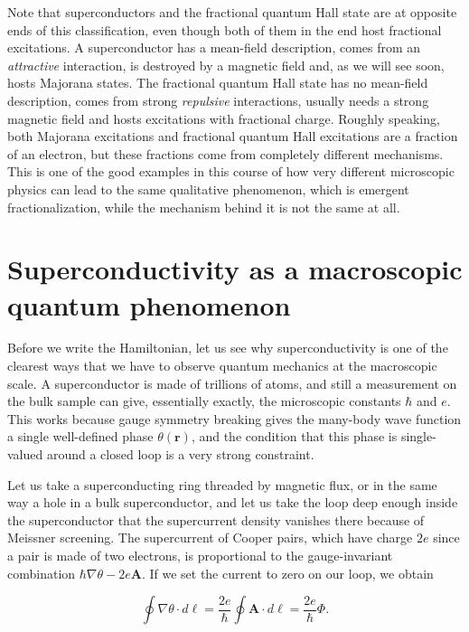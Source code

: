 Note that superconductors and the fractional quantum Hall state are at opposite ends of this
classification, even though both of them in the end host fractional excitations. A superconductor
has a mean-field description, comes from an \emph{attractive} interaction, is destroyed by a
magnetic field and, as we will see soon, hosts Majorana states. The fractional quantum Hall state
has no mean-field description, comes from strong \emph{repulsive} interactions, usually needs a
strong magnetic field and hosts excitations with fractional charge. Roughly speaking, both Majorana
excitations and fractional quantum Hall excitations are a fraction of an electron, but these
fractions come from completely different mechanisms. This is one of the good examples in this course
of how very different microscopic physics can lead to the same qualitative phenomenon, which is
emergent fractionalization, while the mechanism behind it is not the same at all.

\section{Superconductivity as a macroscopic quantum phenomenon}

Before we write the Hamiltonian, let us see why superconductivity is one of the clearest ways that
we have to observe quantum mechanics at the macroscopic scale. A superconductor is made of trillions
of atoms, and still a measurement on the bulk sample can give, essentially exactly, the microscopic
constants $\hbar$ and $e$. This works because gauge symmetry breaking gives the many-body wave
function a single well-defined phase $\theta(\mathbf{r})$, and the condition that this phase is
single-valued around a closed loop is a very strong constraint.

Let us take a superconducting ring threaded by magnetic flux, or in the same way a hole in a bulk
superconductor, and let us take the loop deep enough inside the superconductor that the
supercurrent density vanishes there because of Meissner screening. The supercurrent of Cooper pairs,
which have charge $2e$ since a pair is made of two electrons, is proportional to the gauge-invariant
combination $\hbar\nabla\theta -
2e\mathbf{A}$. If we set the current to zero on our loop, we obtain

\begin{equation*}
\oint \nabla\theta \cdot d\boldsymbol\ell = \frac{2e}{\hbar}\oint \mathbf{A}\cdot d\boldsymbol\ell = \frac{2e}{\hbar}\Phi.
\end{equation*}

